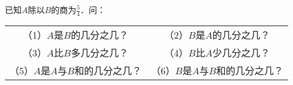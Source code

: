 
已知$A$除以$B$的商为$\frac{5}{4}$．问：\\
\begin{tabular}{cc}
	（1）$A$是$B$的几分之几？\hspace{4em} & （2）$B$是$A$的几分之几？\hspace{4em} \\
	（3）$A$比$B$多几分之几？\hspace{4em} & （4）$B$比$A$少几分之几？\hspace{4em} \\
	（5）$A$是$A$与$B$和的几分之几？\hspace{4em} & （6）$B$是$A$与$B$和的几分之几？\hspace{4em} \\
\end{tabular}
